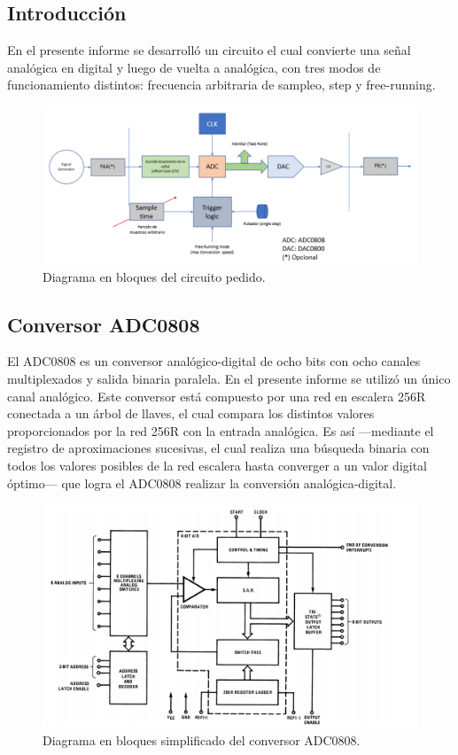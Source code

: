



\subsection{Introducción}

En el presente informe se desarrolló un circuito el cual convierte una señal analógica en digital y luego de vuelta a analógica, con tres modos de funcionamiento distintos: frecuencia arbitraria de sampleo, step y free-running.

\begin{figure}[H]
\centering
\includegraphics[width=0.9\linewidth]{ImagenesEjercicio1/consigna.png}
\caption{Diagrama en bloques del circuito pedido.}
\label{consigna}
\end{figure}

\subsection{Conversor ADC0808}

El ADC0808 es un conversor analógico-digital de ocho bits con ocho canales multiplexados y salida binaria paralela. En el presente informe se utilizó un único canal analógico. Este conversor está compuesto por una red en escalera 256R conectada a un árbol de llaves, el cual compara los distintos valores proporcionados por la red 256R con la entrada analógica. Es así —mediante el registro de aproximaciones sucesivas, el cual realiza una búsqueda binaria con todos los valores posibles de la red escalera hasta converger a un valor digital óptimo— que logra el ADC0808 realizar la conversión analógica-digital.

\begin{figure}[H]
\centering
\includegraphics[width=0.75\linewidth]{ImagenesEjercicio1/ADC_BLOCK.png}
\caption{Diagrama en bloques simplificado del conversor ADC0808.}
\label{ADC_BLOCK}
\end{figure}


